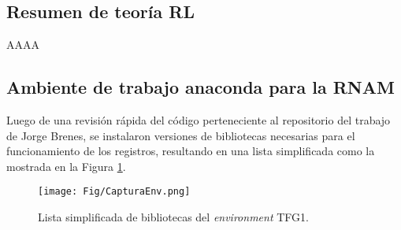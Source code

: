 \documentclass[12pt]{article}
\begin{document}
\subsection*{Resumen de teoría RL}

AAAA

\subsection*{Ambiente de trabajo anaconda para la RNAM}

Luego de una revisión rápida del código perteneciente al repositorio del trabajo de Jorge Brenes, se instalaron versiones de bibliotecas necesarias para el funcionamiento de los registros, resultando en una lista simplificada como la mostrada en la Figura \ref{fig:capturaenv}.

\begin{figure}[h]
	\centering
	\texttt{[image: Fig/CapturaEnv.png]}
	\caption{Lista simplificada de bibliotecas del \textit{environment} TFG1.}
	\label{fig:capturaenv}
\end{figure}
\end{document}
